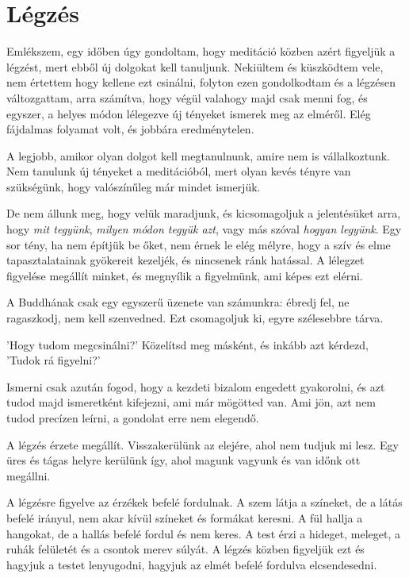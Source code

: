 \hypertarget{luxe9gzuxe9s-1}{%
\chapter{Légzés}\label{luxe9gzuxe9s-1}}

Emlékszem, egy időben úgy gondoltam, hogy meditáció közben azért
figyeljük a légzést, mert ebből új dolgokat kell tanuljunk. Nekiültem és
küszködtem vele, nem értettem hogy kellene ezt csinálni, folyton ezen
gondolkodtam és a légzésen változgattam, arra számítva, hogy végül
valahogy majd csak menni fog, és egyszer, a helyes módon lélegezve új
tényeket ismerek meg az elméről. Elég fájdalmas folyamat volt, és
jobbára eredménytelen.

A legjobb, amikor olyan dolgot kell megtanulnunk, amire nem is
vállalkoztunk. Nem tanulunk új tényeket a meditációból, mert olyan kevés
tényre van szükségünk, hogy valószínűleg már mindet ismerjük.

De nem állunk meg, hogy velük maradjunk, és kicsomagoljuk a jelentésüket
arra, hogy \emph{mit tegyünk}, \emph{milyen módon tegyük azt}, vagy más
szóval \emph{hogyan legyünk}. Egy sor tény, ha nem építjük be őket, nem
érnek le elég mélyre, hogy a szív és elme tapasztalatainak gyökereit
kezeljék, és nincsenek ránk hatással. A lélegzet figyelése megállít
minket, és megnyílik a figyelmünk, ami képes ezt elérni.

A Buddhának csak egy egyszerű üzenete van számunkra: ébredj fel, ne
ragaszkodj, nem kell szenvedned. Ezt csomagoljuk ki, egyre szélesebbre
tárva.

'Hogy tudom megcsinálni?' Közelítsd meg másként, és inkább azt kérdezd,
'Tudok rá figyelni?'

Ismerni csak azután fogod, hogy a kezdeti bizalom engedett gyakorolni,
és azt tudod majd ismeretként kifejezni, ami már mögötted van. Ami jön,
azt nem tudod precízen leírni, a gondolat erre nem elegendő.

A légzés érzete megállít. Visszakerülünk az elejére, ahol nem tudjuk mi
lesz. Egy üres és tágas helyre kerülünk így, ahol magunk vagyunk és van
időnk ott megállni.

A légzésre figyelve az érzékek befelé fordulnak. A szem látja a
színeket, de a látás befelé irányul, nem akar kívül színeket és formákat
keresni. A fül hallja a hangokat, de a hallás befelé fordul és nem
keres. A test érzi a hideget, meleget, a ruhák felületét és a csontok
merev súlyát. A légzés közben figyeljük ezt és hagyjuk a testet
lenyugodni, hagyjuk az elmét befelé fordulva elcsendesedni.

